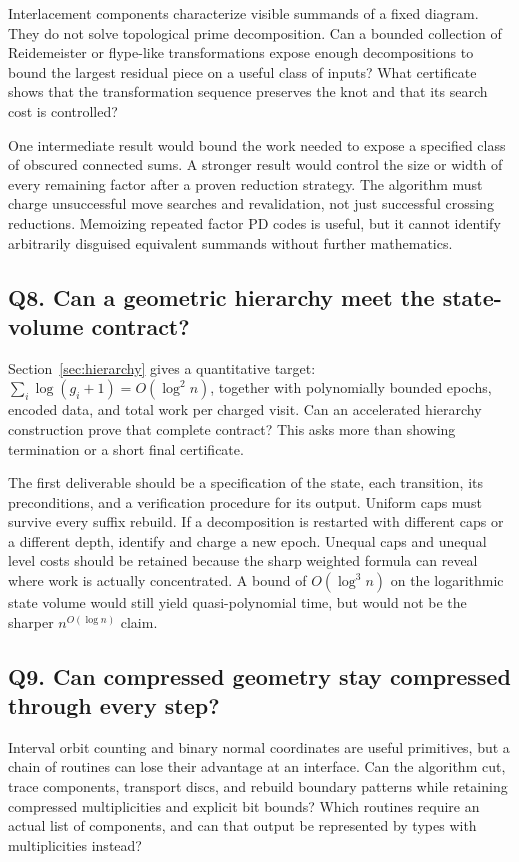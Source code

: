 Interlacement components characterize visible summands of a fixed diagram.
They do not solve topological prime decomposition.  Can a bounded collection
of Reidemeister or flype-like transformations expose enough decompositions
to bound the largest residual piece on a useful class of inputs?  What
certificate shows that the transformation sequence preserves the knot and
that its search cost is controlled?

One intermediate result would bound the work needed to expose a specified
class of obscured connected sums.  A stronger result would control the
size or width of every remaining factor after a proven reduction strategy.
The algorithm must charge unsuccessful move searches and revalidation,
not just successful crossing reductions.  Memoizing repeated factor PD
codes is useful, but it cannot identify arbitrarily disguised equivalent
summands without further mathematics.

\subsection{Q8. Can a geometric hierarchy meet the state-volume contract?}

Section~\ref{sec:hierarchy} gives a quantitative target:
$\sum_i\log(g_i+1)=O(\log^2 n)$, together with polynomially bounded
epochs, encoded data, and total work per charged visit.  Can an accelerated
hierarchy construction prove that complete contract?  This asks more than
showing termination or a short final certificate.

The first deliverable should be a specification of the state, each
transition, its preconditions, and a verification procedure for its output.
Uniform caps must survive every suffix rebuild.  If a decomposition is
restarted with different caps or a different depth, identify and charge a
new epoch.  Unequal caps and unequal level costs should be retained because
the sharp weighted formula can reveal where work is actually concentrated.
A bound of $O(\log^3 n)$ on the logarithmic state volume would still yield
quasi-polynomial time, but would not be the sharper
$n^{O(\log n)}$ claim.

\subsection{Q9. Can compressed geometry stay compressed through every step?}

Interval orbit counting and binary normal coordinates are useful primitives,
but a chain of routines can lose their advantage at an interface.  Can the
algorithm cut, trace components, transport discs, and rebuild boundary
patterns while retaining compressed multiplicities and explicit bit bounds?
Which routines require an actual list of components, and can that output
be represented by types with multiplicities instead?

